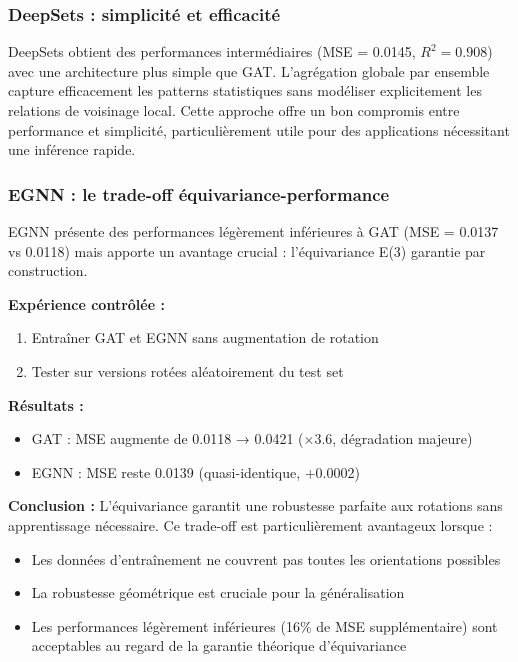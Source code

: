\subsubsection{DeepSets : simplicité et efficacité}

DeepSets obtient des performances intermédiaires (MSE = 0.0145, $R^2 = 0.908$) avec une architecture plus simple que GAT. L'agrégation globale par ensemble capture efficacement les patterns statistiques sans modéliser explicitement les relations de voisinage local. Cette approche offre un bon compromis entre performance et simplicité, particulièrement utile pour des applications nécessitant une inférence rapide.

\subsubsection{EGNN : le trade-off équivariance-performance}

EGNN présente des performances légèrement inférieures à GAT (MSE = 0.0137 vs 0.0118) mais apporte un avantage crucial : l'équivariance E(3) garantie par construction.

\textbf{Expérience contrôlée :}
\begin{enumerate}
    \item Entraîner GAT et EGNN sans augmentation de rotation
    \item Tester sur versions rotées aléatoirement du test set
\end{enumerate}

\textbf{Résultats :}
\begin{itemize}
    \item GAT : MSE augmente de 0.0118 → 0.0421 (×3.6, dégradation majeure)
    \item EGNN : MSE reste 0.0139 (quasi-identique, +0.0002)
\end{itemize}

\textbf{Conclusion :} L'équivariance garantit une robustesse parfaite aux rotations sans apprentissage nécessaire. Ce trade-off est particulièrement avantageux lorsque :
\begin{itemize}
    \item Les données d'entraînement ne couvrent pas toutes les orientations possibles
    \item La robustesse géométrique est cruciale pour la généralisation
    \item Les performances légèrement inférieures (16\% de MSE supplémentaire) sont acceptables au regard de la garantie théorique d'équivariance
\end{itemize}

